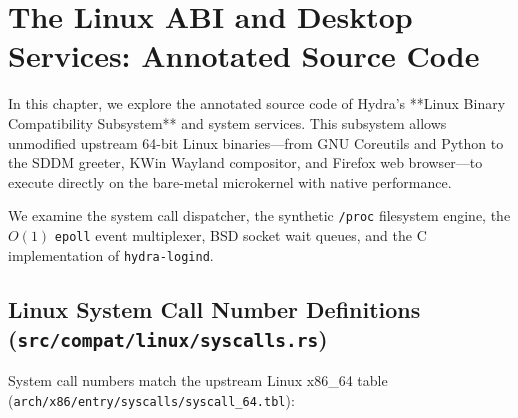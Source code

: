 \chapter{The Linux ABI and Desktop Services: Annotated Source Code}
\label{chap:source_linux_compat}

In this chapter, we explore the annotated source code of Hydra's **Linux Binary Compatibility Subsystem** and system services. This subsystem allows unmodified upstream 64-bit Linux binaries---from GNU Coreutils and Python to the SDDM greeter, KWin Wayland compositor, and Firefox web browser---to execute directly on the bare-metal microkernel with native performance.

We examine the system call dispatcher, the synthetic \texttt{/proc} filesystem engine, the $O(1)$ \texttt{epoll} event multiplexer, BSD socket wait queues, and the C implementation of \texttt{hydra-logind}.

\section{Linux System Call Number Definitions (\texttt{src/compat/linux/syscalls.rs})}
\label{sec:code_syscall_tbl}

System call numbers match the upstream Linux x86\_64 table (\texttt{arch/x86/entry/syscalls/syscall\_64.tbl}):

